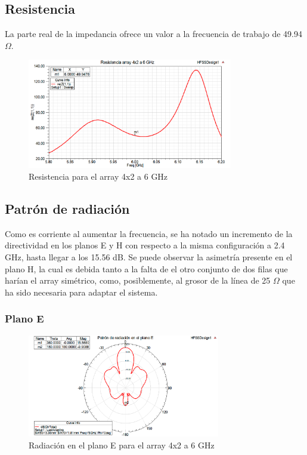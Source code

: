 \subsection{Resistencia}
\par La parte real de la impedancia ofrece un valor a la frecuencia de trabajo de 49.94 $\Omega$.
\\
\begin{figure}[H]
    \centering
        \includegraphics[width=0.8\textwidth]{archivos/analisis/4x22/3}
        \caption{Resistencia para el array 4x2 a 6 GHz}
        \label{fig:resis4x22}
\end{figure}

\subsection{Patrón de radiación}
\par Como es corriente al aumentar la frecuencia, se ha notado un incremento de la directividad en los planos E y H con respecto a la misma configuración a 2.4 GHz, hasta llegar a los 15.56 dB. Se puede observar la asimetría presente en el plano H, la cual es debida tanto a la falta de el otro conjunto de dos filas que harían el array simétrico, como, posiblemente, al grosor de la línea de 25 $\Omega$ que ha sido necesaria para adaptar el sistema.
\\
\subsubsection{Plano E}
\begin{figure}[H]
    \centering
        \includegraphics[width=0.75\textwidth]{archivos/analisis/4x22/4}
        \caption{Radiación en el plano E para el array 4x2 a 6 GHz}
        \label{fig:E4x22}
\end{figure}

